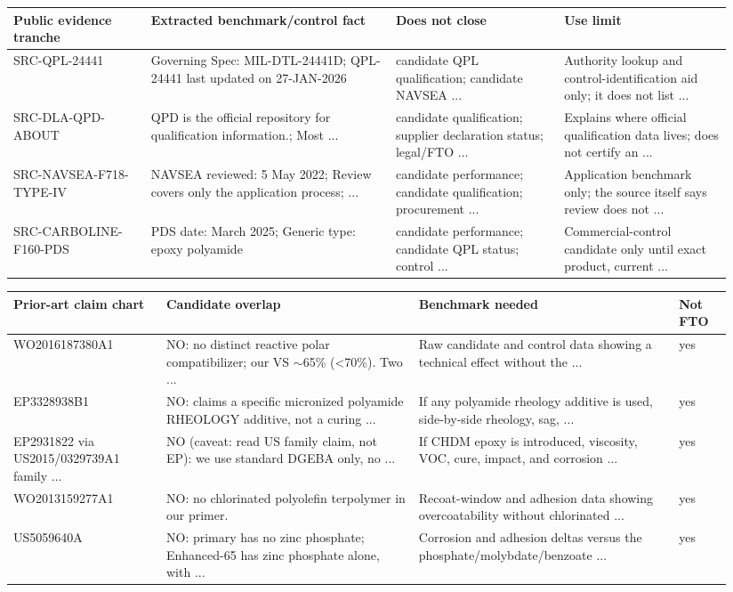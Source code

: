 \documentclass[10pt]{article}
\begin{document}
{\scriptsize\begin{longtable}{@{}p{0.18\linewidth} p{0.32\linewidth} p{0.22\linewidth} p{0.22\linewidth}@{}}\toprule \textbf{Public evidence tranche} & \textbf{Extracted benchmark/control fact} & \textbf{Does not close} & \textbf{Use limit} \\ \midrule SRC-QPL-24441 & Governing Spec: MIL-DTL-24441D; QPL-24441 last updated on 27-JAN-2026 & candidate QPL qualification; candidate NAVSEA ... & Authority lookup and control-identification aid only; it does not list ... \\ SRC-DLA-QPD-ABOUT & QPD is the official repository for qualification information.; Most ... & candidate qualification; supplier declaration status; legal/FTO ... & Explains where official qualification data lives; does not certify an ... \\ SRC-NAVSEA-F718-TYPE-IV & NAVSEA reviewed: 5 May 2022; Review covers only the application process; ... & candidate performance; candidate qualification; procurement ... & Application benchmark only; the source itself says review does not ... \\ SRC-CARBOLINE-F160-PDS & PDS date: March 2025; Generic type: epoxy polyamide & candidate performance; candidate QPL status; control ... & Commercial-control candidate only until exact product, current ... \\ \bottomrule\end{longtable}}
{\scriptsize\begin{longtable}{@{}p{0.20\linewidth} p{0.33\linewidth} p{0.34\linewidth} p{0.07\linewidth}@{}}\toprule \textbf{Prior-art claim chart} & \textbf{Candidate overlap} & \textbf{Benchmark needed} & \textbf{Not FTO} \\ \midrule WO2016187380A1 & NO: no distinct reactive polar compatibilizer; our VS $\sim$65\% (<70\%). Two ... & Raw candidate and control data showing a technical effect without the ... & yes \\ EP3328938B1 & NO: claims a specific micronized polyamide RHEOLOGY additive, not a curing ... & If any polyamide rheology additive is used, side-by-side rheology, sag, ... & yes \\ EP2931822 via US2015/0329739A1 family ... & NO (caveat: read US family claim, not EP): we use standard DGEBA only, no ... & If CHDM epoxy is introduced, viscosity, VOC, cure, impact, and corrosion ... & yes \\ WO2013159277A1 & NO: no chlorinated polyolefin terpolymer in our primer. & Recoat-window and adhesion data showing overcoatability without chlorinated ... & yes \\ US5059640A & NO: primary has no zinc phosphate; Enhanced-65 has zinc phosphate alone, with ... & Corrosion and adhesion deltas versus the phosphate/molybdate/benzoate ... & yes \\ \bottomrule\end{longtable}}
\end{document}
